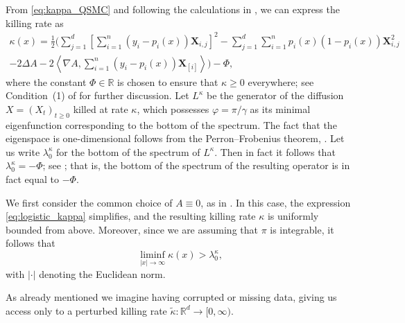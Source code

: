 \documentclass{aptpub}
\newcommand{\R}{\mathbb R}
\newcommand{\Lk}{L^\kappa}
\newcommand{\lkap}{\lambda_0^\kappa}
\begin{document}
From \eqref{eq:kappa_QSMC} and following the calculations in \cite[Appendix C]{Kumar2019}, we can express the killing rate as
\begin{equation}
\begin{split}
        \kappa(x) = \frac{1}{2}\bigg(  \sum_{j=1}^d\left[ \sum_{i=1}^n \left (y_i-p_i(x)\right )\mathbf X_{i,j} \right]^2 
        - \sum_{j=1}^d \sum_{i=1}^n p_i(x)\left (1-p_i(x)\right )\mathbf X^2_{i,j} 
        \\
        -2\Delta A - 2\left \langle \nabla A, \sum_{i=1}^n \left (y_i - p_i(x)\right ) 
    {\mathbf X_{[i]}}
        \right \rangle \bigg)-\Phi,
    \label{eq:logistic_kappa}
\end{split}
\end{equation}
where the constant $\Phi \in \R$ is chosen to ensure that $\kappa \ge 0$ everywhere; see Condition~(1) of \cite{Pollock2020} for further discussion. 
Let $L^\kappa$ be the generator of the diffusion $X=(X_t)_{t\geq 0}$ killed at rate $\kappa$, which possesses $\varphi = \pi/\gamma$ as its minimal eigenfunction corresponding to the bottom of the spectrum. 
The fact that the eigenspace is one-dimensional follows from the Perron--Frobenius theorem, \cite[Chapter XIII.12]{Reed1978}.
Let us write $\lkap$ for the bottom of the spectrum of $\Lk$. 
Then in fact it follows that $\lkap=-\Phi$; see \cite[Section 3.3]{Wang2019TheoQSMC}; that is, the bottom of the spectrum of the resulting operator is in fact equal to $-\Phi$.



We first consider the common choice of $A\equiv 0$, as in \cite{Pollock2020, Kumar2019}. In this case, the expression \eqref{eq:logistic_kappa} simplifies, and the resulting killing rate $\kappa$ is uniformly bounded from above. 
Moreover, since we are assuming that $\pi$ is integrable, it follows that 
\begin{equation}
\label{eq: implies_spectral_gap}
    \liminf_{\vert x\vert \to \infty} \kappa(x) > \lkap,
\end{equation}
with $\vert \cdot \vert$ denoting the Euclidean norm.


 As already mentioned we imagine having corrupted or missing data, giving us access only to a perturbed killing rate $\widetilde{\kappa} \colon \mathbb{R}^d \to [0,\infty)$. 
\end{document}
